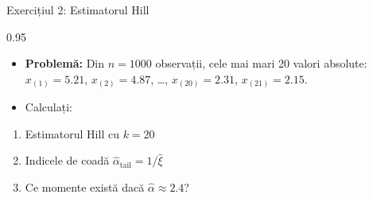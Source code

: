 \documentclass[9pt, aspectratio=169, t]{beamer}
\begin{document}
\begin{frame}{Exercițiul 2: Estimatorul Hill}
    \begin{cminipage}{0.95\textwidth}
    \begin{itemize}\setlength{\itemsep}{0pt}
        \item \textbf{Problemă:} Din $n = 1000$ observații, cele mai mari 20 valori absolute:
    $x_{(1)} = 5.21$, $x_{(2)} = 4.87$, \ldots, $x_{(20)} = 2.31$, $x_{(21)} = 2.15$.
        \item Calculați:
    \end{itemize}
    \begin{enumerate}\setlength{\itemsep}{0pt}
        \item Estimatorul Hill cu $k = 20$
        \item Indicele de coadă $\hat{\alpha}_{\text{tail}} = 1/\hat{\xi}$
        \item Ce momente există dacă $\hat{\alpha} \approx 2.4$?
    \end{enumerate}
    \end{cminipage}
\end{frame}
\end{document}
